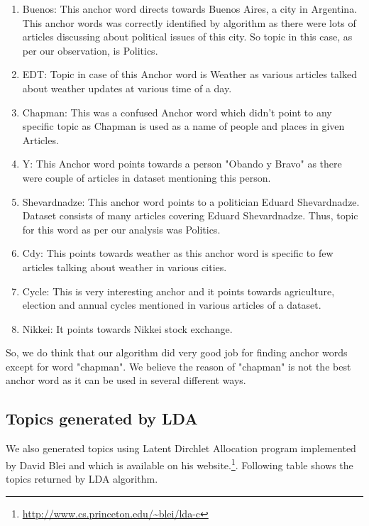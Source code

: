 \documentclass[a4paper,11pt]{article}
\begin{document}
\begin{enumerate}
\item Buenos: This anchor word directs towards Buenos Aires, a city in Argentina. This anchor words was correctly identified by algorithm as there were lots of articles discussing about political issues of this city. So topic in this case, as per our observation, is Politics. 

\item EDT: Topic in case of this Anchor word is Weather as various articles talked about weather updates at various time of a day. 

\item Chapman: This was a confused Anchor word which didn't point to any specific topic as Chapman is used as a name of people and places in given Articles. 

\item Y: This Anchor word points towards a person "Obando y Bravo" as there were couple of articles in dataset mentioning this person. 

\item Shevardnadze: This anchor word points to a politician Eduard Shevardnadze. Dataset consists of many articles covering Eduard Shevardnadze. Thus, topic for this word as per our analysis was Politics. 

\item Cdy: This points towards weather as this anchor word is specific to few articles talking about weather in various cities. 

\item Cycle: This is very interesting anchor and it points towards agriculture, election and annual cycles mentioned in various articles of a dataset. 

\item Nikkei: It points towards Nikkei stock exchange. 

\end{enumerate}

So, we do think that our algorithm did very good job for finding anchor words except for word "chapman". We believe the reason of "chapman" is not the best anchor word as it can be used in several different ways.

\subsection{Topics generated by LDA}
We also generated topics using Latent Dirchlet Allocation program implemented by David Blei and which is available on his website.\footnote{\url{http://www.cs.princeton.edu/~blei/lda-c}}. Following table shows the topics returned by LDA algorithm.  \\
\end{document}
